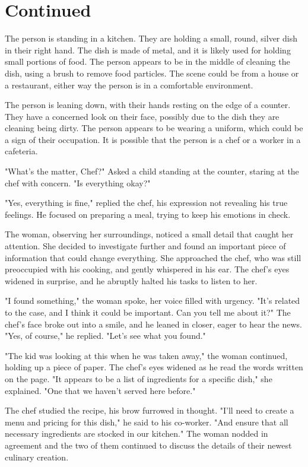 \documentclass[smalldemyvopaper,11pt,twoside,onecolumn,openright,extrafontsizes]{memoir}
\begin{document}
\chapter{Continued}
The person is standing in a kitchen. They are holding a small, round, silver dish in their right hand. The dish is made of metal, and it is likely used for holding small portions of food. The person appears to be in the middle of cleaning the dish, using a brush to remove food particles. The scene could be from a house or a restaurant, either way the person is in a comfortable environment.\par
The person is leaning down, with their hands resting on the edge of a counter. They have a concerned look on their face, possibly due to the dish they are cleaning being dirty. The person appears to be wearing a uniform, which could be a sign of their occupation. It is possible that the person is a chef or a worker in a cafeteria.\par
"What's the matter, Chef?" Asked a child standing at the counter, staring at the chef with concern. "Is everything okay?"\par
"Yes, everything is fine," replied the chef, his expression not revealing his true feelings. He focused on preparing a meal, trying to keep his emotions in check.\par
The woman, observing her surroundings, noticed a small detail that caught her attention. She decided to investigate further and found an important piece of information that could change everything. She approached the chef, who was still preoccupied with his cooking, and gently whispered in his ear. The chef's eyes widened in surprise, and he abruptly halted his tasks to listen to her.\par
"I found something," the woman spoke, her voice filled with urgency. "It's related to the case, and I think it could be important. Can you tell me about it?" The chef's face broke out into a smile, and he leaned in closer, eager to hear the news. "Yes, of course," he replied. "Let's see what you found."\par
"The kid was looking at this when he was taken away," the woman continued, holding up a piece of paper. The chef's eyes widened as he read the words written on the page. "It appears to be a list of ingredients for a specific dish," she explained. "One that we haven't served here before."\par
The chef studied the recipe, his brow furrowed in thought. "I'll need to create a menu and pricing for this dish," he said to his co-worker. "And ensure that all necessary ingredients are stocked in our kitchen." The woman nodded in agreement and the two of them continued to discuss the details of their newest culinary creation.\par
\end{document}
